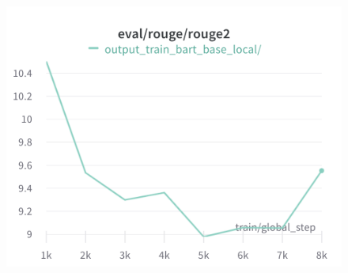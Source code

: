 \documentclass{article}
\begin{document}
\begin{figure}[!htb]
\includegraphics[width=\linewidth]{charts/Section-6-Panel-4-a7t98duha}
\caption{}
\endminipage
\end{figure}
\end{document}

